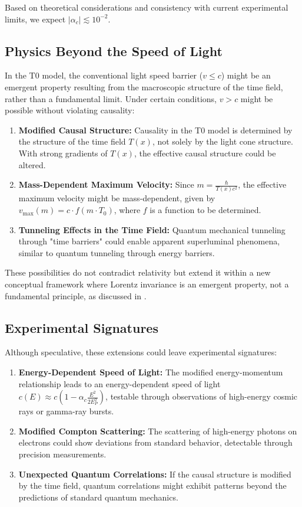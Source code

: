 \documentclass[12pt,a4paper]{article}
\newcommand{\Tfield}{T(x)}
\newcommand{\Tzero}{T_0}
\begin{document}
	Based on theoretical considerations and consistency with current experimental limits, we expect \(|\alpha_c| \lesssim 10^{-2}\).
	
	\subsection{Physics Beyond the Speed of Light}
	\label{subsec:beyond_c}
	
	In the T0 model, the conventional light speed barrier (\(v \leq c\)) might be an emergent property resulting from the macroscopic structure of the time field, rather than a fundamental limit. Under certain conditions, \(v > c\) might be possible without violating causality:
	
	\begin{enumerate}
		\item \textbf{Modified Causal Structure:} Causality in the T0 model is determined by the structure of the time field \(\Tfield\), not solely by the light cone structure. With strong gradients of \(\Tfield\), the effective causal structure could be altered.
		\item \textbf{Mass-Dependent Maximum Velocity:} Since \(m = \frac{\hbar}{\Tfield c^2}\), the effective maximum velocity might be mass-dependent, given by \(v_{\text{max}}(m) = c \cdot f(m \cdot \Tzero)\), where \(f\) is a function to be determined.
		\item \textbf{Tunneling Effects in the Time Field:} Quantum mechanical tunneling through "time barriers" could enable apparent superluminal phenomena, similar to quantum tunneling through energy barriers.
	\end{enumerate}
	
	These possibilities do not contradict relativity but extend it within a new conceptual framework where Lorentz invariance is an emergent property, not a fundamental principle, as discussed in \cite{pascher_zeit_masse_2025}.
	
	\subsection{Experimental Signatures}
	\label{subsec:experimental_signatures}
	
	Although speculative, these extensions could leave experimental signatures:
	
	\begin{enumerate}
		\item \textbf{Energy-Dependent Speed of Light:} The modified energy-momentum relationship leads to an energy-dependent speed of light \(c(E) \approx c (1 - \alpha_c \frac{E^2}{2E_P^2})\), testable through observations of high-energy cosmic rays or gamma-ray bursts.
		\item \textbf{Modified Compton Scattering:} The scattering of high-energy photons on electrons could show deviations from standard behavior, detectable through precision measurements.
		\item \textbf{Unexpected Quantum Correlations:} If the causal structure is modified by the time field, quantum correlations might exhibit patterns beyond the predictions of standard quantum mechanics.
	\end{enumerate}
	
\end{document}
